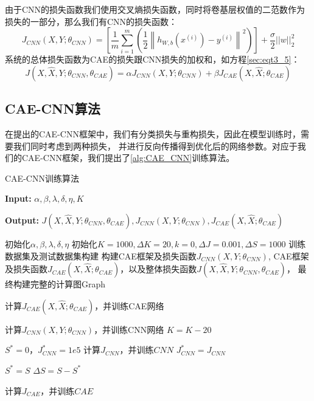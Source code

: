 由于CNN的损失函数我们使用交叉熵损失函数，同时将卷基层权值的二范数作为损失的一部分，那么我们有CNN的损失函数：
\begin{equation}\label{sec:eqt3_4}
	J_{CNN}(X, Y; \theta_{CNN}) = 
	\left[ \frac{1}{m} \sum_{i=1}^m \left( \frac{1}{2} \left\| h_{W,b}(x^{(i)}) - y^{(i)} \right\|^2 \right) \right]
	+ \frac{\sigma}{2} ||w||_2^2
\end{equation}
系统的总体损失函数为CAE的损失跟CNN损失的加权和，如方程\ref{sec:eqt3_5}：
\begin{equation}\label{sec:eqt3_5}
	J(X, \hat{X}, Y; \theta_{CNN}, \theta_{CAE}) = 
		\alpha J_{CNN}(X, Y; \theta_{CNN}) 
		+ \beta J_{CAE}(X, \hat{X}; \theta_{CAE})
\end{equation}

\subsection{CAE-CNN算法}
在提出的CAE-CNN框架中，我们有分类损失与重构损失，因此在模型训练时，需要我们同时考虑到两种损失，
并进行反向传播得到优化后的网络参数。对应于我们的CAE-CNN框架，我们提出了\ref{alg:CAE_CNN}训练算法。

\begin{algorithm}[ht]
	\caption{CAE-CNN训练算法}
	\hspace*{0.02in} {\bf Input:}
	$\alpha, \beta, \lambda, \delta, \eta, K$
	
	\hspace*{0.02in} {\bf Output:}
	$J(X, \hat{X}, Y; \theta_{CNN}, \theta_{CAE}), 
	J_{CNN}(X, Y; \theta_{CNN}) ,
	J_{CAE}(X, \hat{X}; \theta_{CAE})$
	
	\label{alg:CAE_CNN}

	\begin{algorithmic}[1]
		\REQUIRE 初始化$\alpha, \beta, \lambda, \delta, \eta$
		\REQUIRE 初始化$K=1000, \Delta K=20, k=0, \Delta J=0.001, \Delta S=1000$
		\REQUIRE 训练数据集及测试数据集构建
		\REQUIRE 构建CAE框架及损失函数$J_{CNN}(X, Y; \theta_{CNN})$, CAE框架及损失函数$J_{CAE}(X, \hat{X}; \theta_{CAE})$，以及整体损失函数$J(X, \hat{X}, Y; \theta_{CNN}, \theta_{CAE})$，
		最终构建完整的计算图Graph
		
				\STATE 计算$J_{CAE}(X, \hat{X}; \theta_{CAE})$，并训练CAE网络
			\ENDFOR
			
				\STATE 计算$J_{CNN}(X, Y; \theta_{CNN})$，并训练CNN网络
			\ENDFOR
			\STATE $K = K - 20$
		\ENDWHILE
		
		\STATE $S^* = 0$，$J_{CNN}^*=1e5$ 
			\STATE 计算$J_{CNN}$，并训练$CNN$
				\STATE $J_{CNN}^* = J_{CNN}$
				
				\STATE $S^* = S$
			\ELSE
				\STATE $\Delta S = S - S^* $
			\ENDIF
			
				 \STATE 计算$J_{CAE}$，并训练$CAE$
			\ENDIF
		\ENDFOR
	\end{algorithmic}
\end{algorithm}


